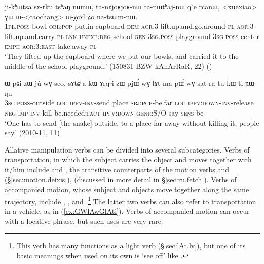\begin{exe}
\ex \label{ex:WXcAl.Zo.natsWmnW}
\gll ji-kʰɯtsa sɤ-rku tsʰaŋ nɯnɯ, ta-nɤjoʁjoʁ-nɯ ta-nɯtʰaj-nɯ qʰe rcanɯ, <xuexiao> ɣɯ ɯ-<caochang> ɯ-χcɤl ʑo na-tsɯm-nɯ. \\
\textsc{1pl}.\textsc{poss}-bowl \textsc{obl}:\textsc{pcp}-put.in cupboard \textsc{dem} \textsc{aor}:3\flobv{}-lift.up.and.go.around-\textsc{pl} \textsc{aor}:3\flobv{}-lift.up.and.carry-\textsc{pl} \textsc{lnk} \textsc{unexp}:\textsc{deg} school \textsc{gen} \textsc{3sg}.\textsc{poss}-playground \textsc{3sg}.\textsc{poss}-center \textsc{emph} \textsc{aor}:3\flobv{}:\textsc{east}-take.away-\textsc{pl} \\
\glt `They lifted up the cupboard where we put our bowls, and carried it to the middle of the school playground.' (150831 BZW kAnArRaR, 22)
()
\end{exe} 

\begin{exe}
\ex \label{ex:WpCi.zW.juwGsco}
\gll  ɯ-pɕi zɯ jú-wɣ-sco, sɤtɕʰa kɯ-ɤrqʰi zɯ pjɯ́-wɣ-lɤt ma-pɯ́-wɣ-sat ra tu-kɯ-ti ɲɯ-ŋu \\
\textsc{3sg}.\textsc{poss}-outside \textsc{loc} \textsc{ipfv}-\textsc{inv}-send place \textsc{sbj}:\textsc{pcp}-be.far \textsc{loc} \textsc{ipfv}:\textsc{down}-\textsc{inv}-release \textsc{neg}-\textsc{imp}-\textsc{inv}-kill be.needed:\textsc{fact} \textsc{ipfv}:\textsc{down}-\textsc{genr}:S/O-say \textsc{sens}-be \\
\glt `One has to send [the snake] outside, to a place far away without killing it, people say.'  (2010-11, 11)
\end{exe} 

Allative manipulation verbs can be divided into several subcategories. Verbs of transportation, in which the subject carries the object and moves together with it/him include  and , the transitive counterparts of the motion verbs  and  (§\ref{sec:motion.deixis}),  (discussed in more detail in §\ref{sec:ru.fetch}). Verbs of accompanied motion, whose subject and objects move together along the same trajectory, include , ,  and .\footnote{This verb has many functions as a light verb (§\ref{sec:lAt.lv}), but one of its basic meanings when used on its own is `see off' like .} The latter two verbs can also refer to transportation in a vehicle, as in (\ref{ex:GWlAwGlAti}). Verbs of accompanied motion can occur with a locative phrase, but such uses are very rare.  


